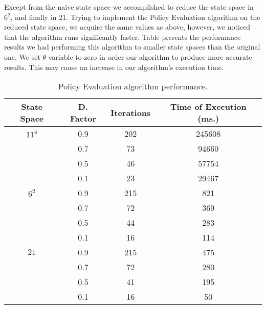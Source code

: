 \documentclass[a4paper,11pt]{article}
\begin{document}
Except from the naive state space we accomplished to reduce the state space in $6^2$, and finally in 21. Trying to implement the Policy Evaluation algorithm on the reduced state space, we acquire the same values as above, however, we noticed that the algorithm runs significantly faster. Table presents the performance results we had performing this algorithm to smaller state spaces than the original one. We set $\theta$ variable to zero in order our algorithm to produce more accurate results. This may cause an increase in our algorithm's execution time.

\begin{table}[h!]
\caption{Policy Evaluation algorithm performance.}
\label{peap}
\begin{center}
\begin{tabular}{c@{ }@{ }c@{ }@{ }c@{ }@{ }c}
\textbf{State Space} & \textbf{D. Factor} & \textbf{Iterations} & \textbf{Time of Execution (ms.)} \\
\midrule
$11^{4}$    & 0.9         & 202         & 245608 \\
        & 0.7         & 73        & 94660    \\
        & 0.5         & 46        & 57754    \\
        & 0.1         & 23        & 29467  \\
$6^{2}$     & 0.9         & 215         & 821    \\
        & 0.7         & 72        & 369  \\
        & 0.5         & 44        & 283    \\
        & 0.1         & 16        & 114    \\
$21$      & 0.9         & 215         & 475  \\
        & 0.7         & 72        & 280  \\
        & 0.5         & 41        & 195  \\
        & 0.1         & 16        & 50  \\
\end{tabular}
\end{center}
\end{table}
\end{document}
